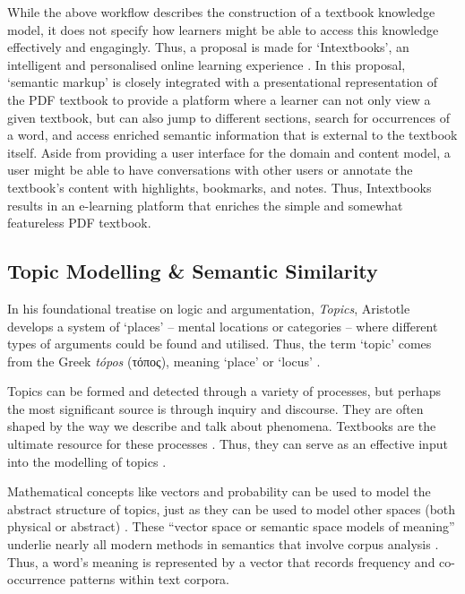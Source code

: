 \documentclass[twocolumn]{article}
\newcommand{\textgreek}[1]{\begingroup\fontencoding{LGR}\selectfont#1\endgroup}
\begin{document}
While the above workflow describes the construction of a textbook knowledge model, it does not specify how learners might be able to access this knowledge effectively and engagingly. Thus, a proposal is made for `Intextbooks', an intelligent and personalised online learning experience \cite{alpizarchacon2020intextbooks}. In this proposal, `semantic markup' is closely integrated with a presentational representation of the PDF textbook to provide a platform where a learner can not only view a given textbook, but can also jump to different sections, search for occurrences of a word, and access enriched semantic information that is external to the textbook itself. Aside from providing a user interface for the domain and content model, a user might be able to have conversations with other users or annotate the textbook's content with highlights, bookmarks, and notes. Thus, Intextbooks results in an e-learning platform that enriches the simple and somewhat featureless PDF textbook. 

\subsection{Topic Modelling \& Semantic Similarity}

In his foundational treatise on logic and argumentation, \textit{Topics}, Aristotle develops a system of `places' – mental locations or categories – where different types of arguments could be found and utilised. Thus, the term `topic' comes from the Greek \textit{tópos} (\textgreek{τόπος}), meaning `place' or `locus' \cite{oed:topic}.

Topics can be formed and detected through a variety of processes, but perhaps the most significant source is through inquiry and discourse. They are often shaped by the way we describe and talk about phenomena. Textbooks are the ultimate resource for these processes \cite{ramnarayan2003}. Thus, they can serve as an effective input into the modelling of topics \cite{alpizarchacon2020}.

Mathematical concepts like vectors and probability can be used to model the abstract structure of topics, just as they can be used to model other spaces (both physical or abstract) \cite{churchill2022}. These ``vector space or semantic space models of meaning'' underlie nearly all modern methods in semantics that involve corpus analysis \cite{bruni2014}. Thus, a word's meaning is represented by a vector that records frequency and co-occurrence patterns within text corpora.
\end{document}
